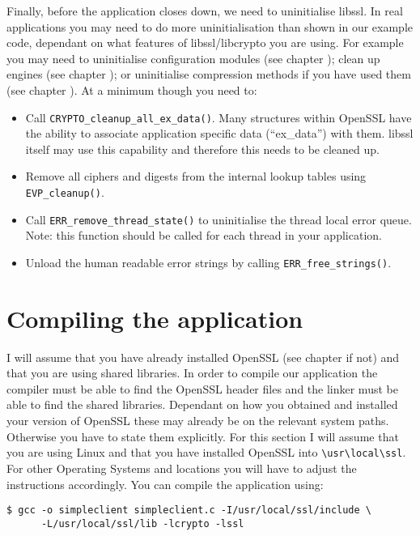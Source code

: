 Finally, before the application closes down, we need to uninitialise libssl. In 
real applications you may need to do more uninitialisation than shown in our 
example code, dependant on what features of libssl/libcrypto you are using. For 
example you may need to uninitialise configuration modules (see chapter
); clean up engines (see chapter ); or
uninitialise compression methods if you have used them (see chapter ). 
At a minimum though you need to:
\begin{itemize}
\item Call \texttt{CRYPTO\_cleanup\_all\_ex\_data()}. Many structures within
OpenSSL have the ability to associate application specific data  (``ex\_data'')
with them. libssl itself may use this capability and therefore  this needs to be
cleaned up.
\item Remove all ciphers and digests from the internal lookup tables using 
\texttt{EVP\_cleanup()}.
\item Call \texttt{ERR\_remove\_thread\_state()} to uninitialise the thread
local error queue. Note: this function should be called for each thread in your
application.
\item Unload the human readable error strings by calling 
\texttt{ERR\_free\_strings()}.
\end{itemize}

\section {Compiling the application}

I will assume that you have already installed OpenSSL (see chapter  if not) and that you are using shared libraries. In order to compile our 
application the compiler must be able to find the OpenSSL header files and the 
linker must be able to find the shared libraries. Dependant on how you obtained 
and installed your version of OpenSSL these may already be on the relevant 
system paths. Otherwise you have to state them explicitly. For this section I 
will assume that you are using Linux and that you have installed OpenSSL into
\verb!\usr\local\ssl!. For other Operating Systems and locations you will have 
to adjust the instructions accordingly. You can compile the application using:

\begin{verbatim}
$ gcc -o simpleclient simpleclient.c -I/usr/local/ssl/include \
      -L/usr/local/ssl/lib -lcrypto -lssl
\end{verbatim}

